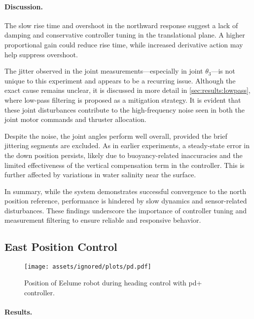 \paragraph{Discussion.}

The slow rise time and overshoot in the northward response suggest a lack of damping and conservative controller tuning in the translational plane. A higher proportional gain could reduce rise time, while increased derivative action may help suppress overshoot.

The jitter observed in the joint measurements—especially in joint \(\theta_3\)—is not unique to this experiment and appears to be a recurring issue. Although the exact cause remains unclear, it is discussed in more detail in \autoref{sec:results:lowpass}, where low-pass filtering is proposed as a mitigation strategy. It is evident that these joint disturbances contribute to the high-frequency noise seen in both the joint motor commands and thruster allocation.

Despite the noise, the joint angles perform well overall, provided the brief jittering segments are excluded. As in earlier experiments, a steady-state error in the down position persists, likely due to buoyancy-related inaccuracies and the limited effectiveness of the vertical compensation term in the controller. This is further affected by variations in water salinity near the surface.

In summary, while the system demonstrates successful convergence to the north position reference, performance is hindered by slow dynamics and sensor-related disturbances. These findings underscore the importance of controller tuning and measurement filtering to ensure reliable and responsive behavior.

\FloatBarrier

\subsection{East Position Control}
\begin{figure}[!ht]
    \centering
    \texttt{[image: assets/ignored/plots/pd.pdf]}
    \caption{Position of Eelume robot during heading control with \gls{pd+} controller.}
    \label{fig:results:dp_east:pos}
\end{figure}

\paragraph{Results.}

